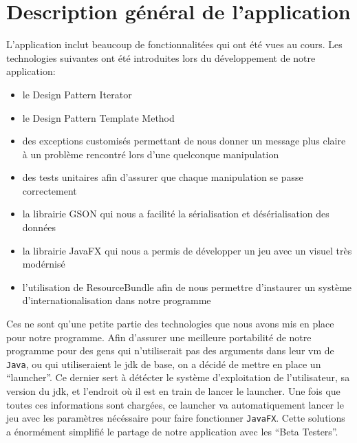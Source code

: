 \section{Description général de l'application}
L'application inclut beaucoup de fonctionnalitées qui ont été vues au cours.
Les technologies suivantes ont été introduites lors du développement de notre application:
\begin{itemize}
\item le Design Pattern Iterator
\item le Design Pattern Template Method
\item des exceptions customisés permettant de nous donner un message plus claire à un problème rencontré lors d'une quelconque manipulation
\item des tests unitaires afin d'assurer que chaque manipulation se passe correctement
\item la librairie GSON qui nous a facilité la sérialisation et désérialisation des données
\item la librairie JavaFX qui nous a permis de développer un jeu avec un visuel très modérnisé
\item l'utilisation de ResourceBundle afin de nous permettre d'instaurer un système d'internationalisation dans notre programme
\end{itemize}
Ces ne sont qu'une petite partie des technologies que nous avons mis en place pour notre programme.
Afin d'assurer une meilleure portabilité de notre programme pour des gens qui n'utiliserait pas des arguments dans leur \acrshort{vm} de \verb|Java|, ou qui utiliseraient le \acrshort{jdk} de base, on a décidé de mettre en place un \enquote{launcher}.
Ce dernier sert à détécter le système d'exploitation de l'utilisateur, sa version du \acrshort{jdk}, et l'endroit où il est en train de lancer le launcher.
Une fois que toutes ces informations sont chargées, ce launcher va automatiquement lancer le jeu avec les paramètres nécéssaire pour faire fonctionner \verb|JavaFX|.
Cette solutions a énormément simplifié le partage de notre application avec les \enquote{Beta Testers}.
